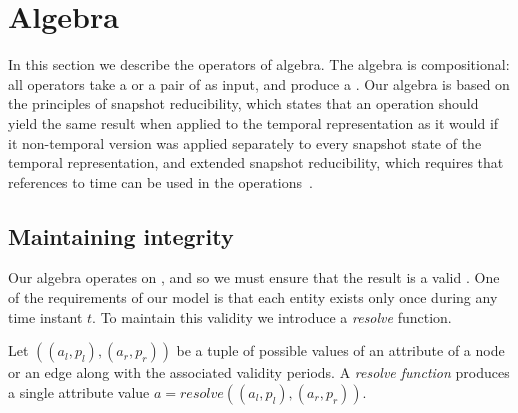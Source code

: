 \section{Algebra}
\label{sec:algebra}
\setlength{\textfloatsep}{5pt}%

In this section we describe the operators of \tg algebra.  The algebra
is compositional: all operators take a \tg or a pair of \tgs as input,
and produce a \tg.  Our algebra is based on the principles of snapshot
reducibility, which states that an operation should yield the same
result when applied to the temporal representation as it would if it
non-temporal version was applied separately to every snapshot state of
the temporal representation, and extended snapshot reducibility, which
requires that references to time can be used in the
operations~\cite{Dignos2012}.


\subsection{Maintaining integrity}
\label{sec:algebra:integrity}

Our algebra operates on \tgs, and so we must
ensure that the result is a valid \tg.  One of the requirements of our
model is that each entity exists only once during any time instant
$t$.  To maintain this validity we introduce a {\em resolve} function.

\begin{definition}
Let $((a_l,p_l),(a_r,p_r))$ be a tuple of possible values of an
attribute of a node or an edge along with the associated validity
periods.  A {\em resolve function} produces a single attribute value
$a = resolve((a_l,p_l), (a_r,p_r))$.
\end{definition}

